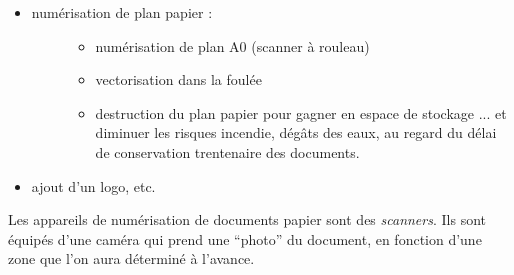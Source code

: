 \documentclass[a4paper,12pt,french]{sphinxmanual}
\begin{document}
\begin{itemize}
\begin{description}
\end{description}

\item {} \begin{description}
\item[{numérisation de plan papier :}] \leavevmode\begin{itemize}
\item {} 
numérisation de plan A0 (scanner à rouleau)

\item {} 
vectorisation dans la foulée

\item {} 
destruction du plan papier pour gagner en espace de stockage ... et diminuer les risques incendie, dégâts des eaux, au regard du délai de conservation trentenaire des documents.

\end{itemize}

\end{description}

\item {} 
ajout d'un logo, etc.

\end{itemize}

Les appareils de numérisation de documents papier sont des \emph{scanners}. Ils sont équipés d'une caméra qui prend une ``photo'' du document, en fonction d'une zone que l'on aura déterminé à l'avance.
\end{document}

